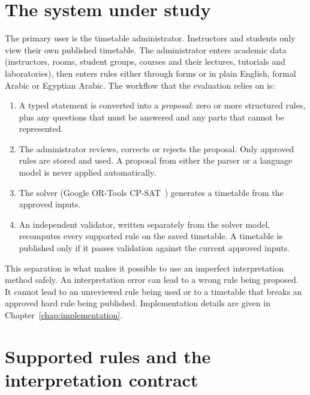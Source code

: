 \section{The system under study}\label{meth-system}

The primary user is the timetable administrator. Instructors and students only view their own published timetable. The administrator enters academic data (instructors, rooms, student groups, courses and their lectures, tutorials and laboratories), then enters rules either through forms or in plain English, formal Arabic or Egyptian Arabic. The workflow that the evaluation relies on is:

\begin{enumerate}
\item A typed statement is converted into a \emph{proposal}: zero or more structured rules, plus any questions that must be answered and any parts that cannot be represented.
\item The administrator reviews, corrects or rejects the proposal. Only approved rules are stored and used. A proposal from either the parser or a language model is never applied automatically.
\item The solver (Google OR-Tools CP-SAT~\cite{google_cpsat}) generates a timetable from the approved inputs.
\item An independent validator, written separately from the solver model, recomputes every supported rule on the saved timetable. A timetable is published only if it passes validation against the current approved inputs.
\end{enumerate}

This separation is what makes it possible to use an imperfect interpretation method safely. An interpretation error can lead to a wrong rule being proposed. It cannot lead to an unreviewed rule being used or to a timetable that breaks an approved hard rule being published. Implementation details are given in Chapter~\ref{chap:implementation}.

\section{Supported rules and the interpretation contract}\label{formal-representation-of-supported-constraints}


